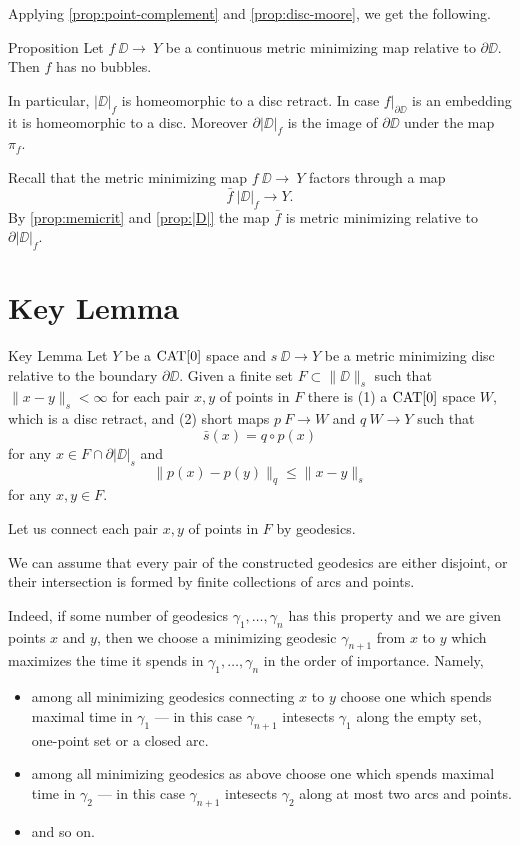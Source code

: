 \documentclass{article}
\begin{document}
Applying \ref{prop:point-complement} and \ref{prop:disc-moore}, we get the following.

\begin{thm}{Proposition}\label{prop:|D|}
Let $f\:\DD\to\ Y$ be a continuous metric minimizing map relative to $\partial \DD$.
Then $f$ has no bubbles.

In particular,  $|\DD|_f$ is homeomorphic to a disc retract. 
In case $f|_{\partial\DD}$ is an
embedding it is homeomorphic to a disc.
Moreover $\partial|\DD|_f$ is the image of $\partial \DD$
under the map $\pi_f$.
\end{thm}

Recall that the metric minimizing map $f\:\DD\to\ Y$ factors through a map \[\bar f\:|\DD|_f\to Y.\]
By \ref{prop:memicrit} and \ref{prop:|D|} 
the map $\bar f$
is metric minimizing relative to $\partial|\DD|_f$.











\section{Key Lemma}


\begin{thm}{Key Lemma}\label{lem:key}
Let $Y$ be a $\mathop{\rm CAT}\nolimits[0]$ space and $s\:\DD\to Y$ 
be a metric minimizing disc relative to the boundary $\partial \DD$.
Given a finite set $F\subset \|\DD\|_s$ such that $\|x-y\|_s<\infty$ for each pair $x,y$ of points in $F$
there is 
(1) a $\mathop{\rm CAT}\nolimits[0]$ space $W$, which is a disc retract,
and (2) short maps $p\:F\to W$ and $q\:W\to Y$ such that
\[\bar s(x)=q\circ p(x)\] 
for any $x\in F\cap \partial |\DD|_s$
and 
\[\|p(x)-p(y)\|_q\le \|x-y\|_s\] 
for any $x,y\in F$.
\end{thm}

Let us connect each pair $x,y$ of points in $F$ by geodesics.

We can assume that 
every pair of the constructed geodesics 
are either disjoint, or their intersection is formed by finite collections of arcs and points.

Indeed, if some number of geodesics $\gamma_1,\dots,\gamma_n$ has this property and we are given points $x$ and $y$, then
we choose a minimizing geodesic $\gamma_{n+1}$ from $x$ to $y$ which maximizes the time it spends in $\gamma_1,\dots,\gamma_n$  in the order of importance.
Namely, 
\begin{itemize}
\item  among all minimizing geodesics connecting $x$ to $y$
choose one which spends maximal time in $\gamma_1$ --- in this case $\gamma_{n+1}$ intesects $\gamma_1$ along the empty set, one-point set or a closed arc.
\item among all minimizing geodesics as above
choose one which spends maximal time in $\gamma_2$ --- in this case $\gamma_{n+1}$ intesects $\gamma_2$ along at most two arcs and points.
\item and so on.
\end{itemize}
\end{document}
